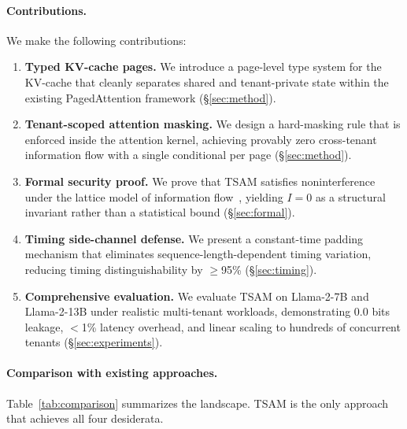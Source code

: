 \documentclass[11pt]{article}
\begin{document}
\paragraph{Contributions.}
We make the following contributions:
\begin{enumerate}[leftmargin=*,itemsep=2pt]
\item \textbf{Typed KV-cache pages.} We introduce a page-level type
  system for the KV-cache that cleanly separates shared and
  tenant-private state within the existing PagedAttention framework
  (\S\ref{sec:method}).

\item \textbf{Tenant-scoped attention masking.} We design a hard-masking
  rule that is enforced inside the attention kernel, achieving provably
  zero cross-tenant information flow with a single conditional per page
  (\S\ref{sec:method}).

\item \textbf{Formal security proof.} We prove that TSAM satisfies
  noninterference~\citep{goguen1982security} under the lattice model of
  information flow~\citep{denning1976lattice}, yielding $I = 0$ as a
  structural invariant rather than a statistical bound
  (\S\ref{sec:formal}).

\item \textbf{Timing side-channel defense.} We present a constant-time
  padding mechanism that eliminates sequence-length-dependent timing
  variation, reducing timing distinguishability by $\geq$95\%
  (\S\ref{sec:timing}).

\item \textbf{Comprehensive evaluation.} We evaluate TSAM on
  Llama-2-7B and Llama-2-13B under realistic multi-tenant workloads,
  demonstrating 0.0 bits leakage, $<$1\% latency overhead, and linear
  scaling to hundreds of concurrent tenants (\S\ref{sec:experiments}).
\end{enumerate}

\paragraph{Comparison with existing approaches.}
Table~\ref{tab:comparison} summarizes the landscape.  TSAM is the only
approach that achieves all four desiderata.
\end{document}
